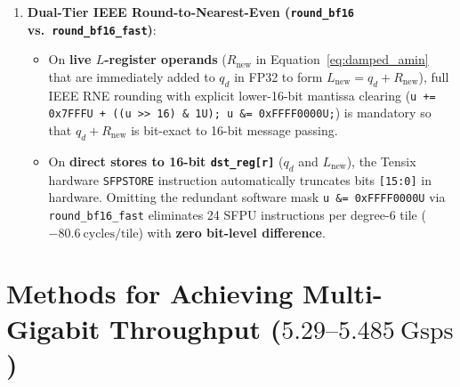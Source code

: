\documentclass[10pt]{article}
\begin{document}
\begin{enumerate}[leftmargin=1.8em, itemsep=3pt]
    \begin{equation}
    R_{\mathrm{new}}(d) = \mathrm{round\_bf16}\!\Bigl(\mathrm{copysgn}\bigl(\beta \cdot \mathrm{AMin}^*\!\left(M_{\mathrm{oth}}, |q_{\mathrm{partner}}|\right),\; S_{\mathrm{total}} \oplus q_d\bigr)\Bigr), \quad \beta = \frac{15}{16} = 0.9375.
    \label{eq:damped_amin}
    \end{equation}
    In finite-precision \texttt{bfloat16} row-layered decoding, pairwise tree reductions exhibit slight non-associativity (differing by $\le 1$ LSB in $\sim 14.7\%$ of evaluations) and positive extrinsic accumulation bias across short graph cycles. Scaling by $\beta = 15/16$ prevents over-confident extrinsic lock-in, matching or exceeding the scalar sequential formulation down to $\mathrm{FER} \sim 10^{-10}$.
    \item \textbf{Dual-Tier IEEE Round-to-Nearest-Even (\texttt{round\_bf16} vs.\ \texttt{round\_bf16\_fast})}:
    \begin{itemize}[leftmargin=1.5em, itemsep=1pt]
        \item On \textbf{live $L$-register operands} ($R_{\mathrm{new}}$ in Equation~\eqref{eq:damped_amin} that are immediately added to $q_d$ in FP32 to form $L_{\mathrm{new}} = q_d + R_{\mathrm{new}}$), full IEEE RNE rounding with explicit lower-16-bit mantissa clearing (\texttt{u += 0x7FFFU + ((u >> 16) \& 1U); u \&= 0xFFFF0000U;}) is mandatory so that $q_d + R_{\mathrm{new}}$ is bit-exact to 16-bit message passing.
        \item On \textbf{direct stores to 16-bit \texttt{dst\_reg[r]}} ($q_d$ and $L_{\mathrm{new}}$), the Tensix hardware \texttt{SFPSTORE} instruction automatically truncates bits \texttt{[15:0]} in hardware. Omitting the redundant software mask \texttt{u \&= 0xFFFF0000U} via \texttt{round\_bf16\_fast} eliminates 24 SFPU instructions per degree-6 tile ($\mathbf{-80.6\ \mathrm{cycles/tile}}$) with \textbf{zero bit-level difference}.
    \end{itemize}
\end{enumerate}

\section{Methods for Achieving Multi-Gigabit Throughput ($5.29\text{--}5.485\ \mathrm{Gsps}$)}
\label{sec:high_throughput_methods}
\end{document}
